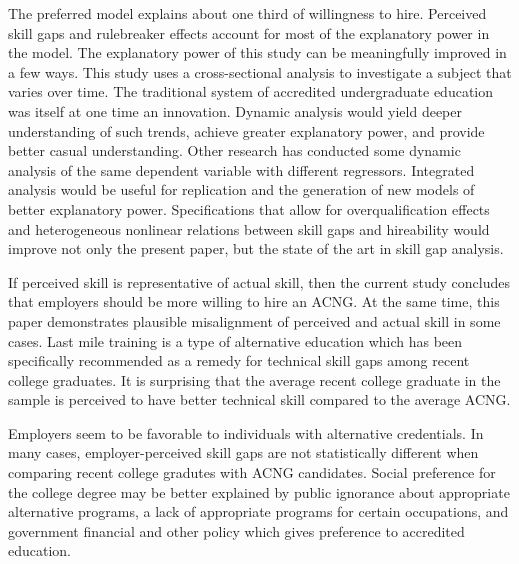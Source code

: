 \documentclass[review]{elsarticle}
\begin{document}

The preferred model explains about one third of willingness to hire.
Perceived skill gaps and rulebreaker effects account for most of the explanatory power in the model.
The explanatory power of this study can be meaningfully improved in a few ways.
This study uses a cross-sectional analysis to investigate a subject that varies over time.
The traditional system of accredited undergraduate education was itself at one time an innovation.
Dynamic analysis would yield deeper understanding of such trends, achieve greater explanatory power, and provide better casual understanding.
Other research has conducted some dynamic analysis of the same dependent variable with different regressors\cite{vandivier2020preliminary}.
Integrated analysis would be useful for replication and the generation of new models of better explanatory power.
Specifications that allow for overqualification effects and heterogeneous nonlinear relations between skill gaps and hireability would improve not only the present paper,
but the state of the art in skill gap analysis.

If perceived skill is representative of actual skill,
then the current study concludes that employers should be more willing to hire an ACNG.
At the same time, this paper demonstrates plausible misalignment of perceived and actual skill in some cases.
Last mile training is a type of alternative education which has been specifically recommended as a remedy for technical skill gaps among recent college graduates.
It is surprising that the average recent college graduate in the sample is perceived to have better technical skill compared to the average ACNG.

Employers seem to be favorable to individuals with alternative credentials.
In many cases, employer-perceived skill gaps are not statistically different when comparing recent college gradutes with ACNG candidates.
Social preference for the college degree may be better explained by public ignorance about appropriate alternative programs,
a lack of appropriate programs for certain occupations,
and government financial and other policy which gives preference to accredited education.
\end{document}
